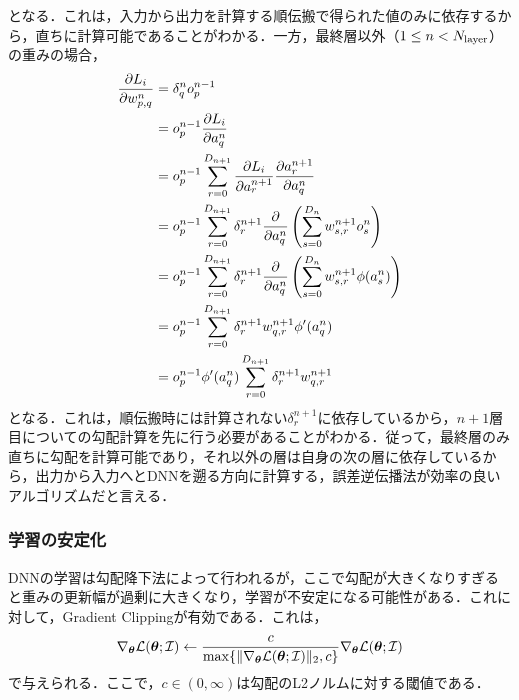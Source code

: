 \documentclass[12pt]{jarticle}
\numberwithin{equation}{section}    %
\numberwithin{figure}{section}      %
\numberwithin{table}{section}      %
\begin{document}
となる．これは，入力から出力を計算する順伝搬で得られた値のみに依存するから，直ちに計算可能であることがわかる．一方，最終層以外（$1 \le n < N_{\text{layer}}$）の重みの場合，
\begin{align}
    \frac{\partial L_{i}}{\partial w_{p, q}^{n}} & = \delta_{q}^{n} o_{p}^{n - 1}                                                                                                                                     \\
                                                           & = o_{p}^{n - 1} \frac{\partial L_{i}}{\partial a_{q}^{n}}                                                                                                          \\
                                                           & = o_{p}^{n - 1} \sum_{r = 0}^{D_{n + 1}} \frac{\partial L_{i}}{\partial a_{r}^{n + 1}} \frac{\partial a_{r}^{n + 1}}{\partial a_{q}^{n}}                 \\
                                                           & = o_{p}^{n - 1} \sum_{r = 0}^{D_{n + 1}} \delta_{r}^{n + 1} \frac{\partial}{\partial a_{q}^{n}} \left(\sum_{s = 0}^{D_{n}} w_{s, r}^{n + 1} o_{s}^{n}\right)       \\
                                                           & = o_{p}^{n - 1} \sum_{r = 0}^{D_{n + 1}} \delta_{r}^{n + 1} \frac{\partial}{\partial a_{q}^{n}} \left(\sum_{s = 0}^{D_{n}} w_{s, r}^{n + 1} \phi(a_{s}^{n})\right) \\
                                                           & = o_{p}^{n - 1} \sum_{r = 0}^{D_{n + 1}} \delta_{r}^{n + 1} w_{q, r}^{n + 1} \phi'(a_{q}^{n})                                                                      \\
                                                           & = o_{p}^{n - 1} \phi'(a_{q}^{n}) \sum_{r = 0}^{D_{n + 1}} \delta_{r}^{n + 1} w_{q, r}^{n + 1}
\end{align}
となる．これは，順伝搬時には計算されない$\delta_{r}^{n + 1}$に依存しているから，$n + 1$層目についての勾配計算を先に行う必要があることがわかる．従って，最終層のみ直ちに勾配を計算可能であり，それ以外の層は自身の次の層に依存しているから，出力から入力へとDNNを遡る方向に計算する，誤差逆伝播法が効率の良いアルゴリズムだと言える．

\subsubsection{学習の安定化}
DNNの学習は勾配降下法によって行われるが，ここで勾配が大きくなりすぎると重みの更新幅が過剰に大きくなり，学習が不安定になる可能性がある．これに対して，Gradient Clippingが有効である．これは，
\begin{equation}
    \nabla_{\bm{\theta}} \mathcal{L}(\bm{\theta}; \mathcal{I}) \gets \frac{c}{\max \{\|\nabla_{\bm{\theta}} \mathcal{L}(\bm{\theta}; \mathcal{I})\|_{2}, c\}} \nabla_{\bm{\theta}} \mathcal{L}(\bm{\theta}; \mathcal{I})
\end{equation}
で与えられる．ここで，$c \in (0, \infty)$は勾配のL2ノルムに対する閾値である．
\end{document}
